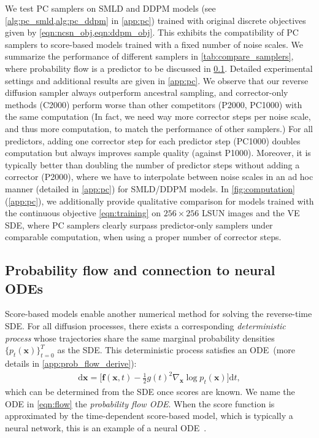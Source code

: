 \documentclass{article} \usepackage{iclr2021_conference,times}
\newcommand{\ud}{\mathrm{d}}
\newcommand{\bfx}{\mathbf{x}}
\newcommand{\bff}{\mathbf{f}}
\begin{document}
We test PC samplers on SMLD and DDPM models (see \cref{alg:pc_smld,alg:pc_ddpm} in \cref{app:pc}) trained with original discrete objectives given by \cref{eqn:ncsn_obj,eqn:ddpm_obj}. This exhibits the compatibility of PC samplers to score-based models trained with a fixed number of noise scales. We summarize the performance of different samplers in \cref{tab:compare_samplers}, where probability flow is a predictor to be discussed in \cref{sec:flow}. Detailed experimental settings and additional results are given in \cref{app:pc}. We observe that our reverse diffusion sampler always outperform ancestral sampling, and corrector-only methods (C2000) perform worse than other competitors (P2000, PC1000) with the same computation (In fact, we need way more corrector steps per noise scale, and thus more computation, to match the performance of other samplers.) For all predictors, adding one corrector step for each predictor step (PC1000) doubles computation but always improves sample quality (against P1000). Moreover, it is typically better than doubling the number of predictor steps without adding a corrector (P2000), where we have to interpolate between noise scales in an ad hoc manner (detailed in \cref{app:pc}) for SMLD/DDPM models. In \cref{fig:computation} (\cref{app:pc}), we additionally provide qualitative comparison for models trained with the continuous objective \cref{eqn:training} on $256\times 256$ LSUN images and the VE SDE, where PC samplers clearly surpass predictor-only samplers under comparable computation, when using a proper number of corrector steps.








\subsection{Probability flow and connection to neural ODEs}\label{sec:flow}
Score-based models enable another numerical method for solving the reverse-time SDE. For all diffusion processes, there exists a corresponding \emph{deterministic process} whose trajectories share the same marginal probability densities $\{p_t(\bfx)\}_{t=0}^T$ as the SDE. This deterministic process satisfies an ODE~(more details in \cref{app:prob_flow_derive}):
\begin{align}
    \ud \bfx = \Big[\bff(\bfx, t) - \frac{1}{2} g(t)^2\nabla_\bfx \log p_t(\bfx)\Big] \ud t, \label{eqn:flow}
\end{align}
which can be determined from the SDE once scores are known. We name the ODE in \cref{eqn:flow} the \emph{probability flow ODE}.
When the score function is approximated by the time-dependent score-based model, which is typically a neural network, this is an example of a neural ODE~\citep{chen2018neural}. 
\end{document}
